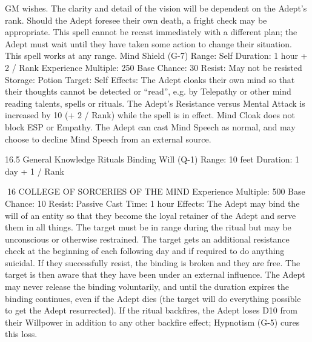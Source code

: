 \documentclass[a4paper]{article}
\begin{document}
\begin{multicols}{3}
GM wishes. The clarity and detail of the vision will
be dependent on the Adept’s rank. Should the
Adept foresee their own death, a fright check may
be appropriate. This spell cannot be recast immediately with a different plan; the Adept must wait
until they have taken some action to change their
situation. This spell works at any range.
Mind Shield (G-7)
Range: Self
Duration: 1 hour + 2 / Rank
Experience Multiple: 250
Base Chance: 30%
Resist: May not be resisted
Storage: Potion
Target: Self
Effects: The Adept cloaks their own mind so that
their thoughts cannot be detected or “read”, e.g. by
Telepathy or other mind reading talents, spells or
rituals. The Adept’s Resistance versus Mental
Attack is increased by 10 (+ 2 / Rank) while the
spell is in effect. Mind Cloak does not block ESP
or Empathy. The Adept can cast Mind Speech as
normal, and may choose to decline Mind Speech
from an external source.

16.5 General Knowledge Rituals
Binding Will (Q-1)
Range: 10 feet
Duration: 1 day + 1 / Rank

16 COLLEGE OF SORCERIES OF THE MIND
Experience Multiple: 500
Base Chance: 10%
Resist: Passive
Cast Time: 1 hour
Effects: The Adept may bind the will of an entity
so that they become the loyal retainer of the Adept
and serve them in all things. The target must be in
range during the ritual but may be unconscious or
otherwise restrained. The target gets an additional
resistance check at the beginning of each following
day and if required to do anything suicidal. If they
successfully resist, the binding is broken and they
are free. The target is then aware that they have
been under an external influence. The Adept may
never release the binding voluntarily, and until the
duration expires the binding continues, even if the
Adept dies (the target will do everything possible
to get the Adept resurrected). If the ritual backfires,
the Adept loses D10 from their Willpower in addition to any other backfire effect; Hypnotism (G-5)
cures this loss.


\end{multicols}
\end{document}
